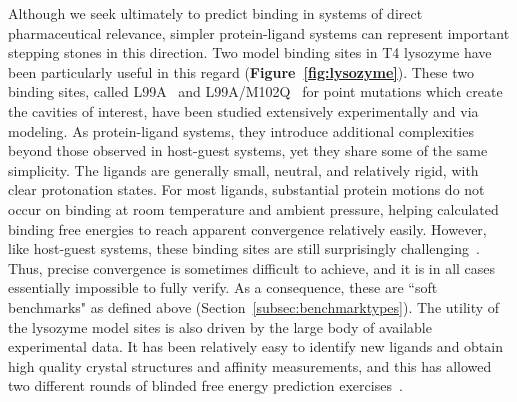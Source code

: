 \documentclass[aps,pre,twocolumn,nofootinbib,superscriptaddress,10pt, final,tightenlines]{revtex4-1}
\begin{document}
Although we seek ultimately to predict binding in systems of direct pharmaceutical relevance, simpler protein-ligand systems can represent important stepping stones in this direction.
Two model binding sites in T4 lysozyme have been particularly useful in this regard ({\bf Figure~\ref{fig:lysozyme}}). 
These two binding sites, called L99A~\cite{morton_energetic_1995, morton_specificity_1995} and L99A/M102Q~\cite{wei_model_2002, graves_decoys_2005} for point mutations which create the cavities of interest, have been studied extensively experimentally and via modeling. 
As protein-ligand systems, they introduce additional complexities beyond those observed in host-guest systems, yet they share some of the same simplicity.
The ligands are generally small, neutral, and relatively rigid, with clear protonation states.
For most ligands, substantial protein motions do not occur on binding at room temperature and ambient pressure, helping calculated binding free energies to reach apparent convergence relatively easily. 
However, like host-guest systems, these binding sites are still surprisingly challenging~\cite{mobley_use_2006, mobley_confine_2007, mobley_predicting_2007, boyce_predicting_2009, jiang_free_2010, gallicchio_binding_2010, lim_sensitivity_2016}. 
Thus, precise convergence is sometimes difficult to achieve, and it is in all cases essentially impossible to fully verify.  As a consequence, these are ``soft benchmarks" as defined above (Section~\ref{subsec:benchmarktypes}).
The utility of the lysozyme model sites is also driven by the large body of available experimental data. 
It has been relatively easy to identify new ligands and obtain high quality crystal structures and affinity measurements, and this has allowed two different rounds of blinded free energy prediction exercises~\cite{mobley_predicting_2007, boyce_predicting_2009}. 
\end{document}
